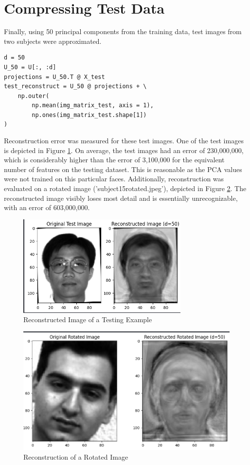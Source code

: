 \documentclass[conference]{IEEEtran}
\begin{document}
\section{Compressing Test Data}
Finally, using 50 principal components from the training data, test images from two subjects were approximated.
\begin{verbatim}
d = 50
U_50 = U[:, :d]
projections = U_50.T @ X_test
test_reconstruct = U_50 @ projections + \
    np.outer(
        np.mean(img_matrix_test, axis = 1),
        np.ones(img_matrix_test.shape[1])
)
\end{verbatim}

Reconstruction error was measured for these test images. One of the test images is depicted in Figure \ref{fig:reconstructed_test}. On average, the test images had an error of 230,000,000, which is considerably higher than the error of 3,100,000 for the equivalent number of features on the testing dataset. This is reasonable as the PCA values were not trained on this particular faces. Additionally, reconstruction was evaluated on a rotated image ('subject15rotated.jpeg'), depicted in Figure \ref{fig:reconstructed_rotated}. The reconstructed image visibly loses most detail and is essentially unrecognizable, with an error of 603,000,000.

\begin{figure}[htbp]
  \centerline{\includegraphics[scale=0.4]{figures/reconstructed_test.png}}
  \caption{Reconstructed Image of a Testing Example}
  \label{fig:reconstructed_test}
\end{figure}  

\begin{figure}[htbp]
  \centerline{\includegraphics[scale=0.4]{figures/reconstructed_rotated.png}}
  \caption{Reconstruction of a Rotated Image}
  \label{fig:reconstructed_rotated}
\end{figure}  
\end{document}
